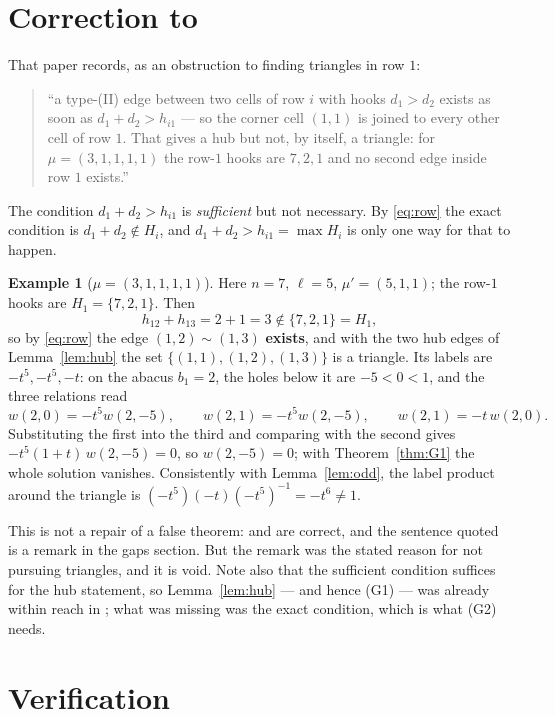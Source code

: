 \documentclass[11pt]{article}
\theoremstyle{definition}
\newtheorem{example}[theorem]{Example}
\begin{document}
\section{Correction to \cite[\S7(2)]{Q140}}\label{sec:correction}

That paper records, as an obstruction to finding triangles in row $1$:

\begin{quote}
``a type-(II) edge between two cells of row $i$ with hooks $d_1>d_2$ exists as soon as
$d_1+d_2>h_{i1}$ --- so the corner cell $(1,1)$ is joined to every other cell of row $1$. That
gives a hub but not, by itself, a triangle: for $\mu=(3,1,1,1,1)$ the row-$1$ hooks are $7,2,1$
and no second edge inside row $1$ exists.''
\end{quote}

The condition $d_1+d_2>h_{i1}$ is \emph{sufficient} but not necessary. By \eqref{eq:row} the
exact condition is $d_1+d_2\notin H_i$, and $d_1+d_2>h_{i1}=\max H_i$ is only one way for that
to happen.

\begin{example}[$\mu=(3,1,1,1,1)$]\label{ex:31111}
Here $n=7$, $\ell=5$, $\mu'=(5,1,1)$; the row-$1$ hooks are $H_1=\{7,2,1\}$. Then
\[
  h_{12}+h_{13}=2+1=3\notin\{7,2,1\}=H_1,
\]
so by \eqref{eq:row} the edge $(1,2)\sim(1,3)$ \textbf{exists}, and with the two hub edges of
Lemma~\ref{lem:hub} the set $\{(1,1),(1,2),(1,3)\}$ is a triangle. Its labels are
$-t^{5},-t^{5},-t$: on the abacus $b_1=2$, the holes below it are $-5<0<1$, and the three
relations read
\[
  w(2,0)=-t^{5}w(2,-5),\qquad w(2,1)=-t^{5}w(2,-5),\qquad w(2,1)=-t\,w(2,0).
\]
Substituting the first into the third and comparing with the second gives
$-t^{5}(1+t)\,w(2,-5)=0$, so $w(2,-5)=0$; with Theorem~\ref{thm:G1} the whole solution
vanishes. Consistently with Lemma~\ref{lem:odd}, the label product around the triangle is
$(-t^5)(-t)(-t^5)^{-1}=-t^{6}\ne1$.
\end{example}

This is not a repair of a false theorem: \cite[Thm.~6.3]{Q140} and \cite[Prop.~6.2]{Q140} are
correct, and the sentence quoted is a remark in the gaps section. But the remark was the stated
reason for not pursuing triangles, and it is void. Note also that the sufficient condition
suffices for the hub statement, so Lemma~\ref{lem:hub} --- and hence (G1) --- was already
within reach in \cite{Q140}; what was missing was the exact condition, which is what (G2) needs.

\section{Verification}\label{sec:verify}
\end{document}

